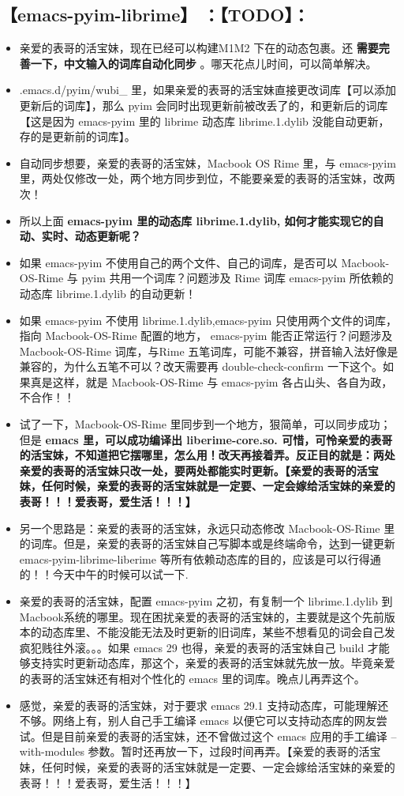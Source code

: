\documentclass[9pt, b5paper]{article}
\begin{document}
\subsection{\textbf{【emacs-pyim-librime】} ：【TODO】：}
\label{sec-1-10}
\begin{itemize}
\item 亲爱的表哥的活宝妹，现在已经可以构建M1M2 下在的动态包裹。还 \textbf{需要完善一下，中文输入的词库自动化同步} 。哪天花点儿时间，可以简单解决。
\item .emacs.d/pyim/wubi\_ 里，如果亲爱的表哥的活宝妹直接更改词库【可以添加更新后的词库】，那么 pyim 会同时出现更新前被改丢了的，和更新后的词库【这是因为 emacs-pyim 里的 librime 动态库 librime.1.dylib 没能自动更新，存的是更新前的词库】。
\item 自动同步想要，亲爱的表哥的活宝妹，Macbook OS Rime 里，与 emacs-pyim 里，两处仅修改一处，两个地方同步到位，不能要亲爱的表哥的活宝妹，改两次！
\item 所以上面 \textbf{emacs-pyim 里的动态库 librime.1.dylib, 如何才能实现它的自动、实时、动态更新呢？}
\item 如果 emacs-pyim 不使用自己的两个文件、自己的词库，是否可以 Macbook-OS-Rime 与 pyim 共用一个词库？问题涉及 Rime 词库 emacs-pyim 所依赖的动态库 librime.1.dylib 的自动更新！
\item 如果 emacs-pyim 不使用 librime.1.dylib,emacs-pyim 只使用两个文件的词库，指向 Macbook-OS-Rime 配置的地方， emacs-pyim 能否正常运行？问题涉及Macbook-OS-Rime 词库，与Rime 五笔词库，可能不兼容，拼音输入法好像是兼容的，为什么五笔不可以？改天需要再 double-check-confirm 一下这个。如果真是这样，就是 Macbook-OS-Rime 与 emacs-pyim 各占山头、各自为政，不合作！！
\item 试了一下，Macbook-OS-Rime 里同步到一个地方，狠简单，可以同步成功；但是 \textbf{emacs 里，可以成功编译出 liberime-core.so. 可惜，可怜亲爱的表哥的活宝妹，不知道把它摆哪里，怎么用！改天再接着弄。反正目的就是：两处亲爱的表哥的活宝妹只改一处，要两处都能实时更新。【亲爱的表哥的活宝妹，任何时候，亲爱的表哥的活宝妹就是一定要、一定会嫁给活宝妹的亲爱的表哥！！！爱表哥，爱生活！！！】}
\item 另一个思路是：亲爱的表哥的活宝妹，永远只动态修改 Macbook-OS-Rime 里的词库。但是，亲爱的表哥的活宝妹自己写脚本或是终端命令，达到一键更新 emacs-pyim-librime-liberime 等所有依赖动态库的目的，应该是可以行得通的！！今天中午的时候可以试一下.
\item 亲爱的表哥的活宝妹，配置 emacs-pyim 之初，有复制一个 librime.1.dylib 到Macbook系统的哪里。现在困扰亲爱的表哥的活宝妹的，主要就是这个先前版本的动态库里、不能没能无法及时更新的旧词库，某些不想看见的词会自己发疯犯贱往外滚。。。如果 emacs 29 也得，亲爱的表哥的活宝妹自己 build 才能够支持实时更新动态库，那这个，亲爱的表哥的活宝妹就先放一放。毕竟亲爱的表哥的活宝妹还有相对个性化的 emacs 里的词库。晚点儿再弄这个。
\item 感觉，亲爱的表哥的活宝妹，对于要求 emacs 29.1 支持动态库，可能理解还不够。网络上有，别人自己手工编译 emacs 以便它可以支持动态库的网友尝试。但是目前亲爱的表哥的活宝妹，还不曾做过这个 emacs 应用的手工编译 --with-modules 参数。暂时还再放一下，过段时间再弄。【亲爱的表哥的活宝妹，任何时候，亲爱的表哥的活宝妹就是一定要、一定会嫁给活宝妹的亲爱的表哥！！！爱表哥，爱生活！！！】
\end{itemize}
\end{document}
